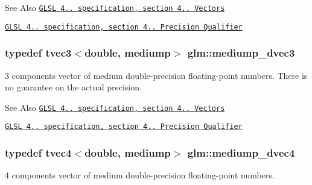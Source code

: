 \begin{DoxySeeAlso}{See Also}
\href{http://www.opengl.org/registry/doc/GLSLangSpec.4.20.8.pdf}{\tt G\-L\-S\-L 4.. specification, section 4.. Vectors} 

\href{http://www.opengl.org/registry/doc/GLSLangSpec.4.20.8.pdf}{\tt G\-L\-S\-L 4.. specification, section 4.. Precision Qualifier} 
\end{DoxySeeAlso}
\hypertarget{group__core__precision_ga4f6942e5a5c9f5dc5a0e1eed980d2ecd}{
\subsubsection[{mediump\-\_\-dvec3}]{\setlength{\rightskip}{0pt plus 5cm}typedef tvec3$<$double, mediump$>$ {\bf glm\-::mediump\-\_\-dvec3}}}\label{group__core__precision_ga4f6942e5a5c9f5dc5a0e1eed980d2ecd}
3 components vector of medium double-\/precision floating-\/point numbers. There is no guarantee on the actual precision.

\begin{DoxySeeAlso}{See Also}
\href{http://www.opengl.org/registry/doc/GLSLangSpec.4.20.8.pdf}{\tt G\-L\-S\-L 4.. specification, section 4.. Vectors} 

\href{http://www.opengl.org/registry/doc/GLSLangSpec.4.20.8.pdf}{\tt G\-L\-S\-L 4.. specification, section 4.. Precision Qualifier} 
\end{DoxySeeAlso}
\hypertarget{group__core__precision_gaf685121e70f851b16581c154d8b27679}{
\subsubsection[{mediump\-\_\-dvec4}]{\setlength{\rightskip}{0pt plus 5cm}typedef tvec4$<$double, mediump$>$ {\bf glm\-::mediump\-\_\-dvec4}}}\label{group__core__precision_gaf685121e70f851b16581c154d8b27679}
4 components vector of medium double-\/precision floating-\/point numbers.

